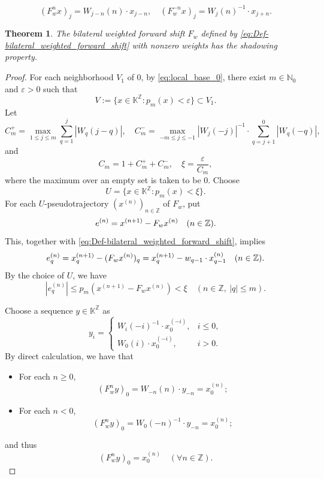 \documentclass[10pt,a4paper]{amsart}
\newtheorem{theorem}{Theorem}
\begin{document}
\begin{equation}\label{eq:Iteration_Formula}
(F_w^n x)_j=W_{j-n}(n)\cdot x_{j-n},
\quad
(F_w^{-n}x)_j=W_j(n)^{-1}\cdot x_{j+n}.
\end{equation}

\begin{theorem}\label{thm:omega-weighted-shift-shadowing}
The bilateral weighted forward shift \(F_w\) defined by
\eqref{eq:Def-bilateral_weighted_forward_shift} with nonzero
weights has the shadowing property.
\end{theorem}

\begin{proof}
For each neighborhood $V_1$ of $0$, by \eqref{eq:local_base_0},
there exist $m\in\mathbb{N}_0$ and $\varepsilon>0$ such that
\[
V:=\{x\in\mathbb{K}^{\mathbb{Z}}:p_m(x)<\varepsilon\}\subset V_1.
\]
Let
\[
C_m^+
=
\max_{1\le j\le m}\sum_{q=1}^{j}|W_q(j-q)|,
\quad
C_m^-
=
\max_{-m\le j\le -1}
|W_j(-j)|^{-1}\cdot \sum_{q=j+1}^{0}|W_q(-q)|,
\]
and
\[
C_m=1+C_m^{+}+C_m^{-},
\quad
\xi=\frac{\varepsilon}{C_m},
\]
where the maximum over an empty set is taken to be \(0\). Choose
\[
U=\{x\in\mathbb{K}^{\mathbb{Z}}:p_m(x)<\xi\}.
\]
For each \(U\)-pseudotrajectory \((x^{(n)})_{n\in\mathbb{Z}}\)
of \(F_w\), put
\begin{equation}\label{eq:Def_e^{n}}
e^{(n)}=x^{(n+1)}-F_{w}x^{(n)}
\quad(n\in\mathbb{Z}).
\end{equation}
This, together with \eqref{eq:Def-bilateral_weighted_forward_shift}, implies
\begin{equation}\label{eq:Def_e_q^{n}}
e_q^{(n)}=x^{(n+1)}_q-(F_{w}x^{(n)})_{q}=
x^{(n+1)}_q-w_{q-1}\cdot x^{(n)}_{q-1}
\quad(n\in\mathbb{Z}).
\end{equation}
By the choice of \(U\), we have
\begin{equation}\label{eq:e_q-Upper-Bound}
|e_q^{(n)}|\leq p_{m}(x^{(n+1)}-F_{w}x^{(n)})<\xi
\quad(n\in\mathbb{Z},\ |q|\le m).
\end{equation}

Choose a sequence \(y\in\mathbb{K}^{\mathbb{Z}}\) as
\[
y_i=
\begin{cases}
W_i(-i)^{-1}\cdot x^{(-i)}_0, & i\le0,\\
W_0(i)\cdot x^{(-i)}_0, & i>0.
\end{cases}
\]
By direct calculation, we have that
\begin{itemize}
  \item For each \(n\geq 0\),
\[
(F_w^n y)_0=W_{-n}(n)\cdot y_{-n}=x^{(n)}_0;
\]
  \item For each \(n<0\),
\[
(F_w^n y)_0=W_0(-n)^{-1}\cdot y_{-n}=x^{(n)}_0;
\]
\end{itemize}
and thus
\begin{equation}\label{eq:F_w^n(y)_0}
(F_w^n y)_0=x^{(n)}_0
\quad(\forall n\in\mathbb{Z}).
\end{equation}


\end{proof}
\end{document}
